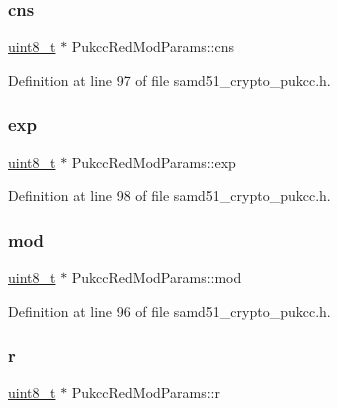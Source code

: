\subsubsection{\texorpdfstring{cns}{cns}}
{\footnotesize\ttfamily \hyperlink{stdint_8h_aba7bc1797add20fe3efdf37ced1182c5}{uint8\+\_\+t} $\ast$ Pukcc\+Red\+Mod\+Params\+::cns}



Definition at line 97 of file samd51\+\_\+crypto\+\_\+pukcc.\+h.

\mbox{\label{structPukccRedModParams_a63087de1b5936442aaeb0f4f0414429b}} 
\subsubsection{\texorpdfstring{exp}{exp}}
{\footnotesize\ttfamily \hyperlink{stdint_8h_aba7bc1797add20fe3efdf37ced1182c5}{uint8\+\_\+t} $\ast$ Pukcc\+Red\+Mod\+Params\+::exp}



Definition at line 98 of file samd51\+\_\+crypto\+\_\+pukcc.\+h.

\mbox{\label{structPukccRedModParams_af09d279077a4542a83ea1a1712c83cc1}} 
\subsubsection{\texorpdfstring{mod}{mod}}
{\footnotesize\ttfamily \hyperlink{stdint_8h_aba7bc1797add20fe3efdf37ced1182c5}{uint8\+\_\+t} $\ast$ Pukcc\+Red\+Mod\+Params\+::mod}



Definition at line 96 of file samd51\+\_\+crypto\+\_\+pukcc.\+h.

\mbox{\label{structPukccRedModParams_ad190b2cdf469a2c0effcbab941c4f844}} 
\subsubsection{\texorpdfstring{r}{r}}
{\footnotesize\ttfamily \hyperlink{stdint_8h_aba7bc1797add20fe3efdf37ced1182c5}{uint8\+\_\+t} $\ast$ Pukcc\+Red\+Mod\+Params\+::r}



